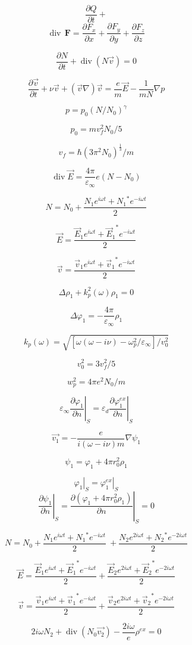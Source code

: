 \documentclass{article}
\begin{document}
\def \eps {\varepsilon}
\def \w {\omega}
\def \ph {\varphi}
\def \kp { \varkappa}
\newcommand{\dt}[1]{\frac{\partial {#1}}{\partial t}}
\newcommand{\dn}[1]{\left.\frac{\partial #1}{\partial n}\right|_{ S}}
\newcommand{\dr}[1]{\left.\frac{\partial #1}{\partial r}\right|_{ r = a}}
\newcommand{\sumexp}[1]{\frac{{#1} e^{i \w t} + {#1}^* e^{-i \w t}}{2}}
\newcommand{\sumexptwo}[1]{\frac{{#1} e^{2 i \w t} + {#1}^* e^{-2 i \w t}}{2}}


\[ \dt{Q} +  \]
\[ \operatorname{div}\,\mathbf{F} =\frac{\partial F_x}{\partial x} +\frac{\partial F_y}{\partial y} +\frac{\partial F_z}{\partial z}\]

\[ \dt{N} + \operatorname{div}(N \vec{v}) = 0 \]

\[ \dt{\vec{v}} + \nu \vec{v} +(\vec{v} \nabla)\vec{v} = \frac{e}{m}\vec{E} - \frac{1}{mN} \nabla p\]

\[ p = p_0 (N/N_0)^\gamma\]

\[ p_0 = m v_f^2 N_0/5\]

\[ v_f = \hbar (3 \pi^2 N_0)^\frac{1}{3}/m\]

\[ \operatorname{div} \vec{E} = \frac{4 \pi}{\eps_\infty}e(N-N_0)\]

\[ N = N_0 + \sumexp{N_1} \]

\[ \vec{E} = \sumexp{\vec{E}_1}\]

\[ \vec{v} = \sumexp{\vec{v}_1}\]

\[ \Delta \rho_1 + k_p^2(\w)\rho_1 = 0\]

\[ \Delta \ph_1 = - \frac{4 \pi}{\eps_\infty} \rho_1 \]

\[  k_p(\w) = \sqrt{[\w(\w - i\nu) - \w_p^2/\eps_\infty]/v_0^2} \]

\[ v_0^2 = 3 v_f^2 / 5\]

\[ w_p^2 = 4 \pi e^2 N_0 / m\]

\[ \eps_\infty \dn{\ph_1} = \eps_d \dn{\ph_1^{ex}}  \]

\[ \vec{v_1} = - \frac{e}{i(\w - i \nu)m}\nabla \psi_1\]

\[ \psi_1 = \ph_1 + 4 \pi r_0^2 \rho_1\]

\[ \left. \ph_1 \right|_{ S} = \left. \ph_1^{ex} \right|_{ S} \]
\[ \dn{\psi_1} = \dn{(\ph_1 + 4 \pi r_0^2 \rho_1)} = 0 \]

\[ N = N_0 + \sumexp{N_1} \ + \sumexptwo{N_2} \]

\[ \vec{E} =\sumexp{\vec{E}_1} + \sumexptwo{\vec{E}_2}\]

\[ \vec{v} =\sumexp{\vec{v}_1} + \sumexptwo{\vec{v}_2}\]

\[ 2i\w N_2 + \operatorname{div}(N_0 \vec{v_2}) - \frac{2i\w}{e}\rho^{ex} = 0\]
\end{document}
